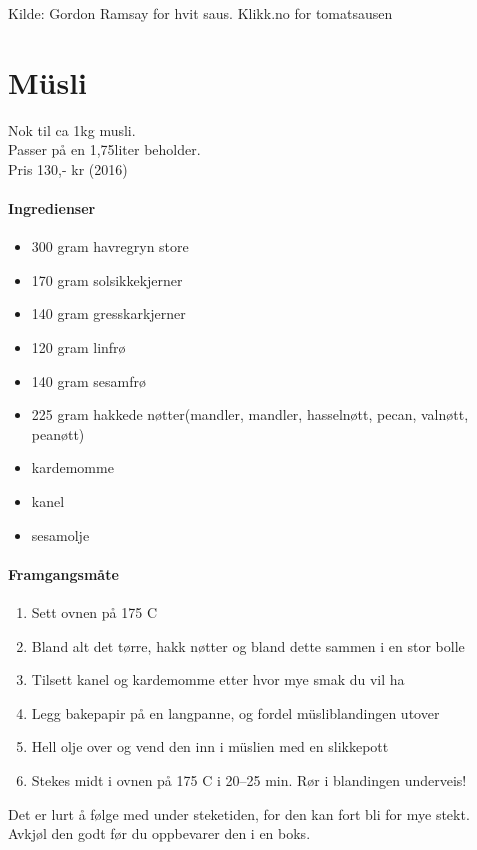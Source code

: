 \documentclass[12pt,a4paper]{book}
\begin{document}
Kilde: Gordon Ramsay for hvit saus. Klikk.no for tomatsausen
\clearpage{}
\clearpage{}\section{﻿Müsli}
Nok til ca 1kg musli.\\ Passer på en 1,75liter beholder.\\
Pris 130,- kr (2016)

\paragraph{Ingredienser}
\begin{itemize}[noitemsep]
	\item 300 gram havregryn store
	\item 170 gram solsikkekjerner
	\item 140 gram gresskarkjerner
	\item 120 gram linfrø
	\item 140 gram sesamfrø
	\item 225 gram hakkede nøtter(mandler, mandler, hasselnøtt, pecan, valnøtt, peanøtt)
	\item kardemomme
	\item kanel
	\item sesamolje
\end{itemize}

\paragraph{Framgangsmåte}
\begin{enumerate}[noitemsep]
	\item	Sett ovnen på 175 \degree C
	\item	Bland alt det tørre, hakk nøtter og bland dette sammen i en stor bolle
	\item	Tilsett kanel og kardemomme etter hvor mye smak du vil ha
	\item	Legg bakepapir på en langpanne, og fordel müsliblandingen utover
	\item	Hell olje over og vend den inn i müslien med en slikkepott
	\item	Stekes midt i ovnen på 175 \degree C i 20--25 min. Rør i blandingen underveis!
\end{enumerate}


Det er lurt å følge med under steketiden, for den kan fort bli for mye stekt.
Avkjøl den godt før du oppbevarer den i en boks.
\end{document}
